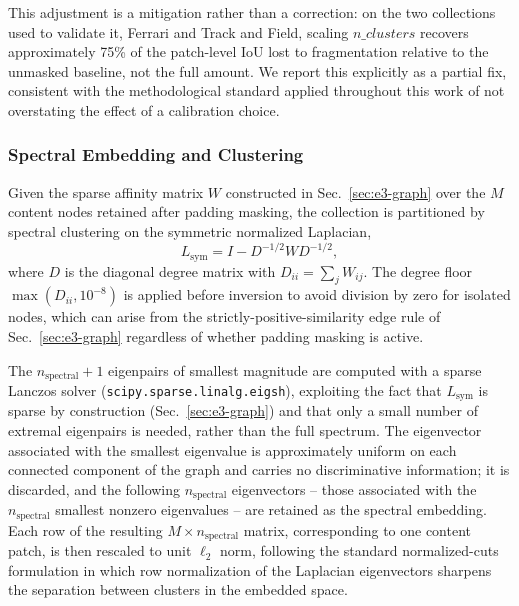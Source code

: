 This adjustment is a mitigation rather than a correction: on the two collections used to validate it, Ferrari and Track and Field, scaling $n\_clusters$ recovers approximately 75\% of the patch-level IoU lost to fragmentation relative to the unmasked baseline, not the full amount. We report this explicitly as a partial fix, consistent with the methodological standard applied throughout this work of not overstating the effect of a calibration choice. %

\subsubsection{Spectral Embedding and Clustering}
\label{sec:e3-spectral}

Given the sparse affinity matrix $W$ constructed in Sec.~\ref{sec:e3-graph} over the $M$ content nodes retained after padding masking, the collection is partitioned by spectral clustering on the symmetric normalized Laplacian,
\[
L_{\text{sym}} = I - D^{-1/2} W D^{-1/2},
\]
where $D$ is the diagonal degree matrix with $D_{ii} = \sum_j W_{ij}$. The degree floor $\max(D_{ii}, 10^{-8})$ is applied before inversion to avoid division by zero for isolated nodes, which can arise from the strictly-positive-similarity edge rule of Sec.~\ref{sec:e3-graph} regardless of whether padding masking is active.

The $n_{\text{spectral}}+1$ eigenpairs of smallest magnitude are computed with a sparse Lanczos solver (\texttt{scipy.sparse.linalg.eigsh}), exploiting the fact that $L_{\text{sym}}$ is sparse by construction (Sec.~\ref{sec:e3-graph}) and that only a small number of extremal eigenpairs is needed, rather than the full spectrum. The eigenvector associated with the smallest eigenvalue is approximately uniform on each connected component of the graph and carries no discriminative information; it is discarded, and the following $n_{\text{spectral}}$ eigenvectors -- those associated with the $n_{\text{spectral}}$ smallest nonzero eigenvalues -- are retained as the spectral embedding. Each row of the resulting $M \times n_{\text{spectral}}$ matrix, corresponding to one content patch, is then rescaled to unit $\ell_2$ norm, following the standard normalized-cuts formulation in which row normalization of the Laplacian eigenvectors sharpens the separation between clusters in the embedded space.

